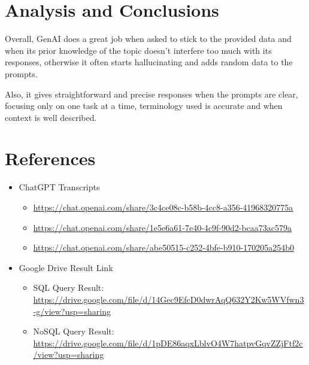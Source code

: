 \documentclass[10pt,onecolumn,letterpaper]{article}
\begin{document}
\section*{Analysis and Conclusions}
Overall, GenAI does a great job when asked to stick to the provided data and when its prior knowledge of the topic doesn’t interfere too much with its responses, otherwise it often starts hallucinating and adds random data to the prompts.

Also, it gives straightforward and precise responses when the prompts are clear, focusing only on one task at a time, terminology used is accurate and when context is well described.

\section*{References}
\begin{itemize}
  \item ChatGPT Transcripts
  \begin{itemize}
    \item \url{https://chat.openai.com/share/3c4ce08c-b58b-4cc8-a356-41968320775a}
    \item \url{https://chat.openai.com/share/1e5e6a61-7e40-4c9f-90d2-bcaa73ac579a}
    \item \url{https://chat.openai.com/share/abe50515-c252-4bfe-b910-170205a254b0}
  \end{itemize}
  
  \item Google Drive Result Link
   \begin{itemize}
     \item SQL Query Result: \url {https://drive.google.com/file/d/14Gec9EfcD0dwrAqQ632Y2Kw5WVfwn3-g/view?usp=sharing}
     \item NoSQL Query Result: \url {https://drive.google.com/file/d/1pDE86aqxLblvO4W7hatpvGqvZZjFtf2c/view?usp=sharing}
  \end{itemize}
\end{itemize}
\end{document}
